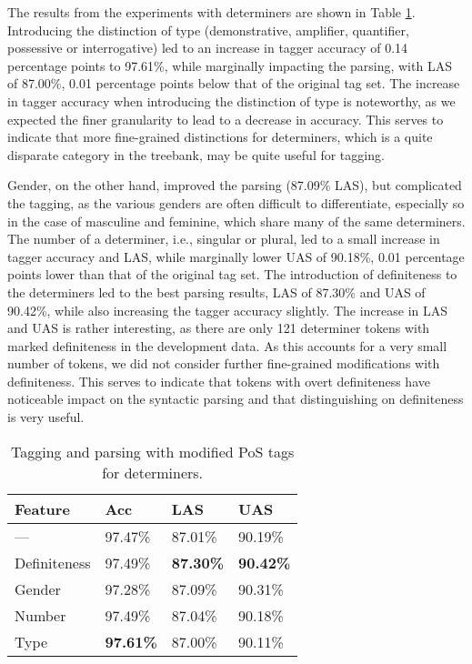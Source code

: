 \documentclass[11pt,a4paper]{article}
\begin{document}
The results from the experiments with determiners are shown in Table
\ref{detresults}. Introducing the distinction of type (demonstrative,
amplifier, quantifier, possessive or interrogative) led to an increase in
tagger accuracy of 0.14 percentage points to 97.61\%, while marginally
impacting the parsing, with LAS of 87.00\%, 0.01 percentage points below that
of the original tag set.  The increase in tagger accuracy when introducing the
distinction of type is noteworthy, as we expected the finer granularity to lead
to a decrease in accuracy. This serves to indicate that more fine-grained
distinctions for determiners, which is a quite disparate category in the
treebank, may be quite useful for tagging.


Gender, on the other hand, improved the parsing (87.09\% LAS), but complicated
the tagging, as the various genders are often difficult to differentiate,
especially so in the case of masculine and feminine, which share many of the
same determiners. The number of a determiner, i.e., singular or plural, led to
a small increase in tagger accuracy and LAS, while marginally lower UAS of
90.18\%, 0.01 percentage points lower than that of the original tag set. The
introduction of definiteness to the determiners led to the best parsing
results, LAS of 87.30\% and UAS of 90.42\%, while also increasing the tagger
accuracy slightly. The increase in LAS and UAS is rather interesting, as there
are only 121 determiner tokens with marked definiteness in the development
data. As this accounts for a very small number of tokens, we did not consider
further fine-grained modifications with definiteness. This serves to indicate
that tokens with overt definiteness have noticeable impact on the syntactic
parsing and that distinguishing on definiteness is very useful.

\begin{table}
    \centering
    \smaller[0.5]
    \begin{tabular}{@{}llll@{}}
        \toprule
        \textbf{Feature} & \textbf{Acc} & \textbf{LAS} & \textbf{UAS} \\
        \midrule
        --- & 97.47\% & 87.01\% & 90.19\% \\
        Definiteness & 97.49\% & \textbf{87.30\%} & \textbf{90.42\%} \\
        Gender & 97.28\% & 87.09\% & 90.31\% \\
        Number & 97.49\% & 87.04\% & 90.18\% \\
        Type & \textbf{97.61\%} & 87.00\% & 90.11\% \\
        \bottomrule
    \end{tabular}
    \caption{Tagging and parsing with modified PoS tags for determiners.}
    \label{detresults}
\end{table}
\end{document}
